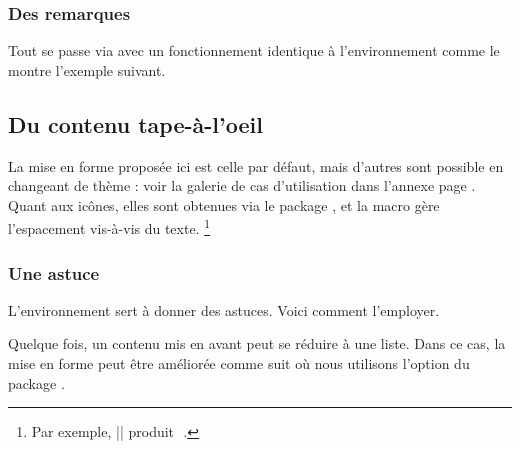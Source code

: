 



\subsubsection{Des remarques}

Tout se passe via  avec un fonctionnement identique à l'environnement  comme le montre l'exemple suivant.





\subsection{Du contenu tape-à-l'oeil}
\label{tutodoc-admonitions}

\begin{tdocnote}
    La mise en forme proposée ici est celle par défaut, mais d'autres sont possible en changeant de thème : voir la galerie de cas d'utilisation dans l'annexe page \pageref{tutodoc-theme-gallery}.
    Quant aux icônes, elles sont obtenues via le package , et la macro  gère l'espacement vis-à-vis du texte.
    \footnote{
        Par exemple,
        \tdoclatexin||
        produit\,
        \,.
    }
\end{tdocnote}



\subsubsection{Une astuce}

L'environnement  sert à donner des astuces. Voici comment l'employer.




\smallskip


\begin{tdoctip}
    Quelque fois, un contenu mis en avant peut se réduire à une liste. Dans ce cas, la mise en forme peut être améliorée comme suit où nous utilisons l'option  du package .


\end{tdoctip}


